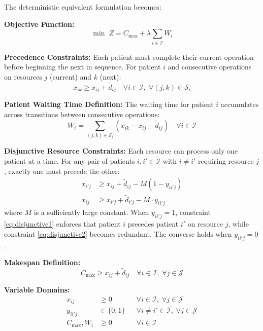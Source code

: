 \documentclass[11pt,a4paper]{article}
\begin{document}
The deterministic equivalent formulation becomes:

\textbf{Objective Function:}
\begin{equation}
\min \; Z = C_{\max} + \lambda \sum_{i \in \mathcal{I}} W_i
\label{eq:objective}
\end{equation}

\textbf{Precedence Constraints:} Each patient must complete their current operation before beginning the next in sequence. For patient $i$ and consecutive operations on resources $j$ (current) and $k$ (next):
\begin{equation}
x_{ik} \geq x_{ij} + \tilde{d}_{ij} \quad \forall i \in \mathcal{I}, \; \forall (j, k) \in \mathcal{S}_i
\label{eq:precedence}
\end{equation}

\textbf{Patient Waiting Time Definition:} The waiting time for patient $i$ accumulates across transitions between consecutive operations:
\begin{equation}
W_i = \sum_{(j,k) \in \mathcal{S}_i} \left( x_{ik} - x_{ij} - \tilde{d}_{ij} \right) \quad \forall i \in \mathcal{I}
\label{eq:wait_time}
\end{equation}

\textbf{Disjunctive Resource Constraints:} Each resource can process only one patient at a time. For any pair of patients $i, i' \in \mathcal{I}$ with $i \neq i'$ requiring resource $j$, exactly one must precede the other:
\begin{align}
x_{i'j} &\geq x_{ij} + \tilde{d}_{ij} - M(1 - y_{ii'j}) \label{eq:disjunctive1} \\
x_{ij} &\geq x_{i'j} + \tilde{d}_{i'j} - M \cdot y_{ii'j} \label{eq:disjunctive2}
\end{align}
where $M$ is a sufficiently large constant. When $y_{ii'j} = 1$, constraint \eqref{eq:disjunctive1} enforces that patient $i$ precedes patient $i'$ on resource $j$, while constraint \eqref{eq:disjunctive2} becomes redundant. The converse holds when $y_{ii'j} = 0$.

\textbf{Makespan Definition:}
\begin{equation}
C_{\max} \geq x_{ij} + \tilde{d}_{ij} \quad \forall i \in \mathcal{I}, \; \forall j \in \mathcal{J}
\label{eq:makespan}
\end{equation}

\textbf{Variable Domains:}
\begin{align}
x_{ij} &\geq 0 && \forall i \in \mathcal{I}, \; \forall j \in \mathcal{J} \\
y_{ii'j} &\in \{0, 1\} && \forall i \neq i' \in \mathcal{I}, \; \forall j \in \mathcal{J} \\
C_{\max}, W_i &\geq 0 && \forall i \in \mathcal{I}
\end{align}
\end{document}
